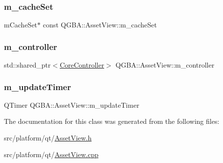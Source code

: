 \subsubsection{\texorpdfstring{m\+\_\+cache\+Set}{m\_cacheSet}}
{\footnotesize\ttfamily m\+Cache\+Set$\ast$ const Q\+G\+B\+A\+::\+Asset\+View\+::m\+\_\+cache\+Set\hspace{0.3cm}{\ttfamily [protected]}}

\mbox{\label{class_q_g_b_a_1_1_asset_view_a83056c8c594d800c39aa0ba571a2603a}} 
\subsubsection{\texorpdfstring{m\+\_\+controller}{m\_controller}}
{\footnotesize\ttfamily std\+::shared\+\_\+ptr$<$\mbox{\hyperlink{class_q_g_b_a_1_1_core_controller}{Core\+Controller}}$>$ Q\+G\+B\+A\+::\+Asset\+View\+::m\+\_\+controller\hspace{0.3cm}{\ttfamily [private]}}

\mbox{\label{class_q_g_b_a_1_1_asset_view_a7061a8321755debdc41f68bf7a070897}} 
\subsubsection{\texorpdfstring{m\+\_\+update\+Timer}{m\_updateTimer}}
{\footnotesize\ttfamily Q\+Timer Q\+G\+B\+A\+::\+Asset\+View\+::m\+\_\+update\+Timer\hspace{0.3cm}{\ttfamily [private]}}



The documentation for this class was generated from the following files\+:\begin{DoxyCompactItemize}
\item 
src/platform/qt/\mbox{\hyperlink{_asset_view_8h}{Asset\+View.\+h}}\item 
src/platform/qt/\mbox{\hyperlink{_asset_view_8cpp}{Asset\+View.\+cpp}}\end{DoxyCompactItemize}
